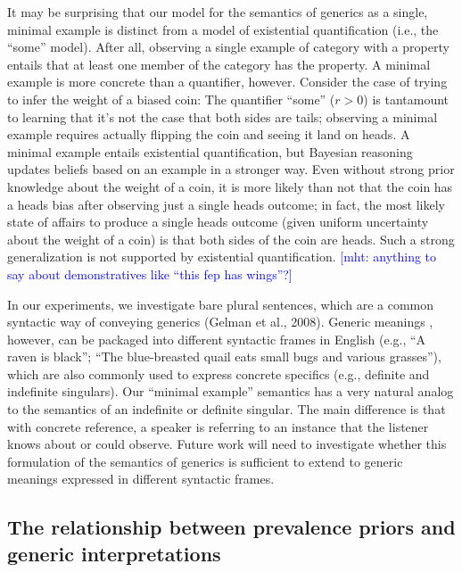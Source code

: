 \documentclass[floatsintext,doc]{apa6}
\newcommand{\mht}[1]{{\textcolor{Blue}{[mht: #1]}}}
\begin{document}
It may be surprising that our model for the semantics of generics as a single, minimal example is distinct from a model of existential quantification (i.e., the ``some'' model). 
After all, observing a single example of category with a property entails that at least one member of the category has the property. 
A minimal example is more concrete than a quantifier, however.
Consider the case of trying to infer the weight of a biased coin: The quantifier ``some'' ($r > 0$) is tantamount to learning that it's not the case that both sides are tails; observing a minimal example requires actually flipping the coin and seeing it land on heads. 
A minimal example entails existential quantification, but Bayesian reasoning updates beliefs based on an example in a stronger way.
Even without strong prior knowledge about the weight of a coin, it is more likely than not that the coin has a heads bias after observing just a single heads outcome; in fact, the most likely state of affairs to produce a single heads outcome (given uniform uncertainty about the weight of a coin) is that both sides of the coin are heads.
Such a strong generalization is not supported by existential quantification.
\mht{anything to say about demonstratives like ``this fep has wings''?}

In our experiments, we investigate bare plural sentences, which are a common syntactic way of conveying generics (Gelman et al., 2008).
Generic meanings , however, can be packaged into different syntactic frames in English (e.g., ``A raven is black''; ``The blue-breasted quail eats small bugs and various grasses''), which are also commonly used to express concrete specifics (e.g., definite and indefinite singulars). 
Our ``minimal example'' semantics has a very natural analog to the semantics of an indefinite or definite singular.
The main difference is that with concrete reference, a speaker is referring to an instance that the listener knows about or could observe. 
Future work will need to investigate whether this formulation of the semantics of generics is sufficient to extend to generic meanings expressed in different syntactic frames. 

\hypertarget{the-relationship-between-prevalence-priors-and-generic-interpretations}{%
\subsection{The relationship between prevalence priors and generic interpretations}\label{the-relationship-between-prevalence-priors-and-generic-interpretations}}
\end{document}
